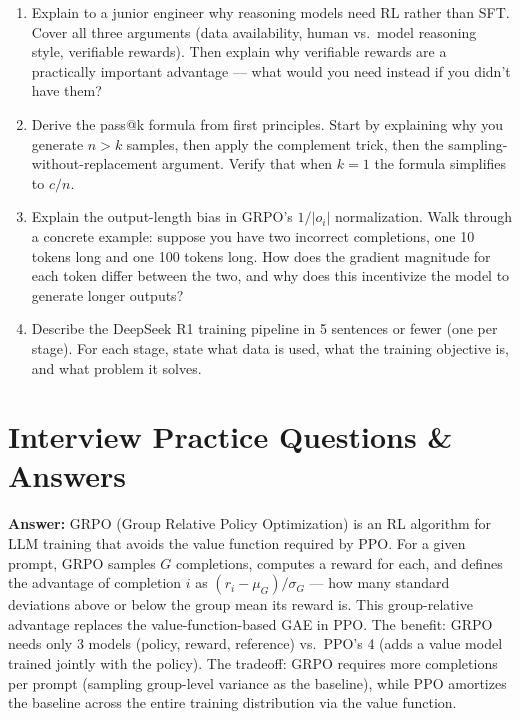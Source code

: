 \documentclass[11pt, a4paper]{article}
\begin{document}
\begin{enumerate}[leftmargin=2em]
  \item Explain to a junior engineer why reasoning models need RL rather than SFT. Cover all three arguments (data availability, human vs.\ model reasoning style, verifiable rewards). Then explain why verifiable rewards are a practically important advantage --- what would you need instead if you didn't have them?

  \item Derive the pass@k formula from first principles. Start by explaining why you generate $n > k$ samples, then apply the complement trick, then the sampling-without-replacement argument. Verify that when $k=1$ the formula simplifies to $c/n$.

  \item Explain the output-length bias in GRPO's $1/|o_i|$ normalization. Walk through a concrete example: suppose you have two incorrect completions, one 10 tokens long and one 100 tokens long. How does the gradient magnitude for each token differ between the two, and why does this incentivize the model to generate longer outputs?

  \item Describe the DeepSeek R1 training pipeline in 5 sentences or fewer (one per stage). For each stage, state what data is used, what the training objective is, and what problem it solves.
\end{enumerate}

\newpage
\section{Interview Practice Questions \& Answers}

\begin{notebox}
\textbf{Answer:} GRPO (Group Relative Policy Optimization) is an RL algorithm for LLM training that avoids the value function required by PPO. For a given prompt, GRPO samples $G$ completions, computes a reward for each, and defines the advantage of completion $i$ as $(r_i - \mu_G) / \sigma_G$ --- how many standard deviations above or below the group mean its reward is. This group-relative advantage replaces the value-function-based GAE in PPO. The benefit: GRPO needs only 3 models (policy, reward, reference) vs.\ PPO's 4 (adds a value model trained jointly with the policy). The tradeoff: GRPO requires more completions per prompt (sampling group-level variance as the baseline), while PPO amortizes the baseline across the entire training distribution via the value function.
\end{notebox}
\end{document}
